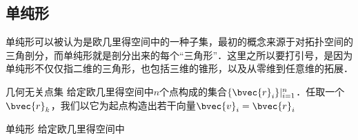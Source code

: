 
\subsection{单纯形}

单纯形可以被认为是欧几里得空间中的一种子集，最初的概念来源于对拓扑空间的三角剖分，而单纯形就是剖分出来的每个“三角形”．这里之所以要打引号，是因为单纯形不仅仅指二维的三角形，也包括三维的锥形，以及从零维到任意维的拓展．

\begin{definition}{几何无关点集}
给定欧几里得空间中$n$个点构成的集合$\{\bvec{r}_i\}|_{i=1}^n$．任取一个$\bvec{r}_k$，我们以它为起点构造出若干向量$\bvec{v}_i=\bvec{r}_i$
\end{definition}

\begin{definition}{单纯形}
给定欧几里得空间中
\end{definition}









